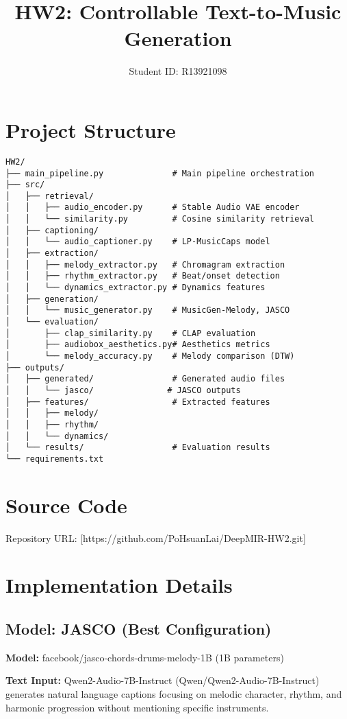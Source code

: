 \documentclass{article}
\title{HW2: Controllable Text-to-Music Generation}
\author{Student ID: R13921098}
\date{}
\begin{document}
\maketitle

\section{Project Structure}

\begin{verbatim}
HW2/
├── main_pipeline.py              # Main pipeline orchestration
├── src/
│   ├── retrieval/
│   │   ├── audio_encoder.py      # Stable Audio VAE encoder
│   │   └── similarity.py         # Cosine similarity retrieval
│   ├── captioning/
│   │   └── audio_captioner.py    # LP-MusicCaps model
│   ├── extraction/
│   │   ├── melody_extractor.py   # Chromagram extraction
│   │   ├── rhythm_extractor.py   # Beat/onset detection
│   │   └── dynamics_extractor.py # Dynamics features
│   ├── generation/
│   │   └── music_generator.py    # MusicGen-Melody, JASCO
│   └── evaluation/
│       ├── clap_similarity.py    # CLAP evaluation
│       ├── audiobox_aesthetics.py# Aesthetics metrics
│       └── melody_accuracy.py    # Melody comparison (DTW)
├── outputs/
│   ├── generated/                # Generated audio files
│   │   └── jasco/               # JASCO outputs
│   ├── features/                 # Extracted features
│   │   ├── melody/
│   │   ├── rhythm/
│   │   └── dynamics/
│   └── results/                  # Evaluation results
└── requirements.txt
\end{verbatim}

\section{Source Code}

Repository URL: [https://github.com/PoHsuanLai/DeepMIR-HW2.git]

\section{Implementation Details}

\subsection{Model: JASCO (Best Configuration)}

\textbf{Model:} facebook/jasco-chords-drums-melody-1B (1B parameters)

\textbf{Text Input:} Qwen2-Audio-7B-Instruct (Qwen/Qwen2-Audio-7B-Instruct) generates natural language captions focusing on melodic character, rhythm, and harmonic progression without mentioning specific instruments.
\end{document}
